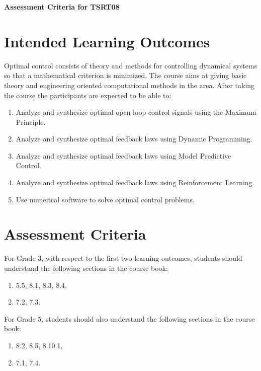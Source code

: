 \documentclass[11pt,a4paper]{article}
\newenvironment{compactenum}
    {\begin{enumerate}\setlength{\itemsep}{0pt}\setlength{\parsep}{0pt}\setlength{\topsep}{0.25em}}
    {\end{enumerate}}
\begin{document}
\begin{center}
    {\Large\bfseries Assessment Criteria for TSRT08}
\end{center}

\section{Intended Learning Outcomes}

Optimal control consists of theory and methods for controlling dynamical systems so that a mathematical criterion is minimized. The course aims at giving basic theory and engineering oriented computational methods in the area. After taking the course the participants are expected to be able to:

\begin{compactenum}
    \item Analyze and synthesize optimal open loop control signals using the Maximum Principle.
    \item Analyze and synthesize optimal feedback laws using Dynamic Programming.
    \item Analyze and synthesize optimal feedback laws using Model Predictive Control.
    \item Analyze and synthesize optimal feedback laws using Reinforcement Learning.
    \item Use numerical software to solve optimal control problems.
\end{compactenum}

\section{Assessment Criteria}

For Grade 3, with respect to the first two learning outcomes, students should understand the following sections in the course book:

\begin{compactenum}
    \item 5.5, 8.1, 8.3, 8.4.
    \item 7.2, 7.3.
\end{compactenum}

For Grade 5, students should also understand the following sections in the course book:

\begin{compactenum}
    \item 8.2, 8.5, 8.10.1.
    \item 7.1, 7.4.
\end{compactenum}
\end{document}

